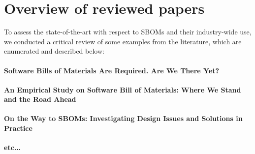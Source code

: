 \section{Overview of reviewed papers}

To assess the state-of-the-art with respect to SBOMs and their industry-wide use, we conducted a critical review of some examples from the literature, which are enumerated and described below:

\paragraph{Software Bills of Materials Are Required. Are We There Yet?}
\paragraph{An Empirical Study on Software Bill of Materials: Where We Stand and the Road Ahead}
\paragraph{On the Way to SBOMs: Investigating Design Issues and Solutions in Practice}
\paragraph{etc...}